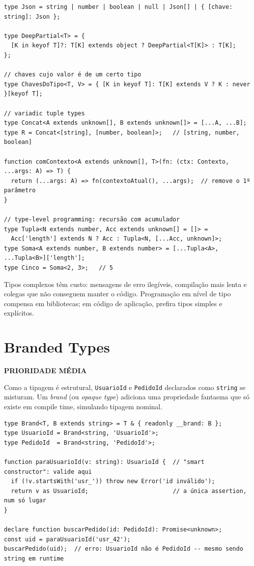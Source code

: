 \documentclass[12pt,a4paper,oneside]{book}
\newcommand{\media}{\colorbox{orange!20}{\sffamily\scriptsize\bfseries PRIORIDADE MÉDIA}}
\newcommand{\code}[1]{\texttt{#1}}
\begin{document}
\begin{verbatim}
type Json = string | number | boolean | null | Json[] | { [chave: string]: Json };

type DeepPartial<T> = {
  [K in keyof T]?: T[K] extends object ? DeepPartial<T[K]> : T[K];
};

// chaves cujo valor é de um certo tipo
type ChavesDoTipo<T, V> = { [K in keyof T]: T[K] extends V ? K : never }[keyof T];

// variadic tuple types
type Concat<A extends unknown[], B extends unknown[]> = [...A, ...B];
type R = Concat<[string], [number, boolean]>;   // [string, number, boolean]

function comContexto<A extends unknown[], T>(fn: (ctx: Contexto, ...args: A) => T) {
  return (...args: A) => fn(contextoAtual(), ...args);  // remove o 1º parâmetro
}

// type-level programming: recursão com acumulador
type Tupla<N extends number, Acc extends unknown[] = []> =
  Acc['length'] extends N ? Acc : Tupla<N, [...Acc, unknown]>;
type Soma<A extends number, B extends number> = [...Tupla<A>, ...Tupla<B>]['length'];
type Cinco = Soma<2, 3>;   // 5
\end{verbatim}

\begin{cuidado}
Tipos complexos têm custo: mensagens de erro ilegíveis, compilação mais lenta e colegas que não conseguem manter o código. Programação em nível de tipo compensa em bibliotecas; em código de aplicação, prefira tipos simples e explícitos.
\end{cuidado}

\section{Branded Types}
\media

Como a tipagem é estrutural, \code{UsuarioId} e \code{PedidoId} declarados como \code{string} se misturam. Um \emph{brand} (ou \emph{opaque type}) adiciona uma propriedade fantasma que só existe em compile time, simulando tipagem nominal.

\begin{verbatim}
type Brand<T, B extends string> = T & { readonly __brand: B };
type UsuarioId = Brand<string, 'UsuarioId'>;
type PedidoId  = Brand<string, 'PedidoId'>;

function paraUsuarioId(v: string): UsuarioId {  // "smart constructor": valide aqui
  if (!v.startsWith('usr_')) throw new Error('id inválido');
  return v as UsuarioId;                        // a única assertion, num só lugar
}

declare function buscarPedido(id: PedidoId): Promise<unknown>;
const uid = paraUsuarioId('usr_42');
buscarPedido(uid);  // erro: UsuarioId não é PedidoId -- mesmo sendo string em runtime
\end{verbatim}
\end{document}
